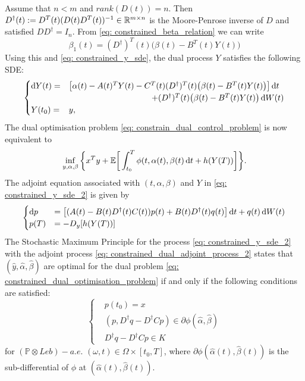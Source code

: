 Assume that $n < m$ and $rank(D(t)) = n$. Then $D^\dagger(t) := D^T(t) (D(t) D^T(t))^{-1} \in \mathbb{R}^{m \times n}$ is the Moore-Penrose inverse of $D$ and satisfied $D D^\dagger = I_n$. From \eqref{eq: constrained_beta_relation} we can write 
\begin{equation*}
    \beta_1(t) = (D^\dagger)^T(t) \big(\beta(t) - B^T(t) Y(t)\big)
\end{equation*}
Using this and \eqref{eq: constrained_y_sde}, the dual process $Y$ satisfies the following SDE:
\begin{align}
\begin{cases}
    \mathop{}\!\mathrm{d} Y(t) = &\big[ \alpha(t) - A(t)^T Y(t) - C^T(t) (D^\dagger)^T(t) \big(\beta(t) - B^T(t) Y(t)\big)\big]\mathop{}\!\mathrm{d} t\\
    &\quad \quad \quad \quad \quad \quad \quad \quad \quad \quad + (D^\dagger)^T(t) \big(\beta(t) - B^T(t) Y(t)\big) \mathop{}\!\mathrm{d} W(t)\\
    Y(t_0) = &y,
\end{cases} \label{eq: constrained_y_sde_2}
\end{align}
The dual optimisation problem \eqref{eq: constrain_dual_control_problem} is now equivalent to
\begin{equation}
    \inf_{y, \alpha, \beta} \bigg \{ x^T y + \mathbb{E} \bigg[ \int_{t_0}^T \phi(t, \alpha(t), \beta(t) \mathop{}\!\mathrm{d} t + h(Y(T)) \bigg] \bigg\}. \label{eq: constrained_dual_optimisation_problem}
\end{equation}
The adjoint equation associated with $(t, \alpha, \beta)$ and $Y$ in \eqref{eq: constrained_y_sde_2} is given by
\begin{equation}
    \begin{cases}
        \mathop{}\!\mathrm{d} p &= \big[ (A(t) - B(t) D^\dagger
        (t) C(t)) p(t) + B(t) D^\dagger(t) q(t) \big] \mathop{}\!\mathrm{d} t + q(t) \mathop{}\!\mathrm{d} W(t)\\
        p(T) &= - D_y[h(Y(T))]
    \end{cases} \label{eq: constrained_dual_adjoint_process_2}
\end{equation}
The Stochastic Maximum Principle for the process \eqref{eq: constrained_y_sde_2} with the adjoint process \eqref{eq: constrained_dual_adjoint_process_2} states that $(\hat{y}, \hat{\alpha}, \hat{\beta})$ are optimal for the dual problem \eqref{eq: constrained_dual_optimisation_problem} if and only if the following conditions are satisfied:
\begin{equation}
    \begin{cases}
        &p(t_0) = x\\
        &(p, D^\dagger q - D^\dagger C p) \in \partial \phi(\hat{\alpha}, \hat{\beta})\\
        &D^\dagger q - D^\dagger C p \in K
    \end{cases} \label{eq: constrained_control_conditions_optimality}
\end{equation}
for $(\mathbb{P} \otimes Leb) - a.e.$ $(\omega, t) \in \Omega \times [t_0, T]$, where $\partial \phi(\hat{\alpha}(t), \hat{\beta}(t))$ is the sub-differential of $\phi$ at $(\hat{\alpha}(t), \hat{\beta}(t))$.

